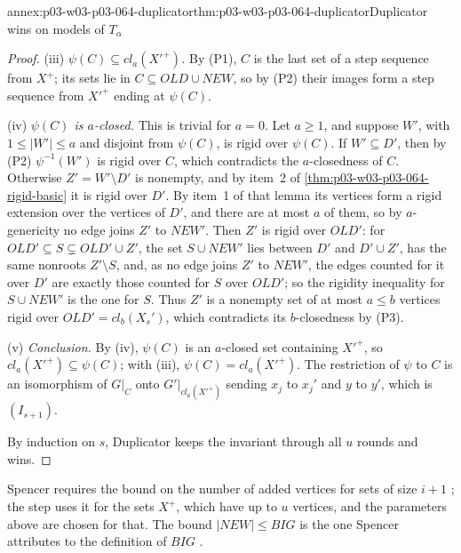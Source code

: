 \begin{annexitem}{annex:p03-w03-p03-064-duplicator}{thm:p03-w03-p03-064-duplicator}{Duplicator wins on models of \(T_\alpha\)}
\begin{proof}
(iii) \emph{\(\psi(C)\subseteq cl_a(X'^+)\).}  By (P1), \(C\) is the last set
of a step sequence from \(X^+\); its sets lie in
\(C\subseteq\mathit{OLD}\cup\mathit{NEW}\), so by (P2) their images form a
step sequence from \(X'^+\) ending at \(\psi(C)\).

(iv) \emph{\(\psi(C)\) is \(a\)-closed.}  This is trivial for \(a=0\).  Let
\(a\geq1\), and suppose \(W'\), with \(1\leq|W'|\leq a\) and disjoint from
\(\psi(C)\), is rigid over \(\psi(C)\).  If \(W'\subseteq D'\), then by (P2)
\(\psi^{-1}(W')\) is rigid over \(C\), which contradicts the \(a\)-closedness
of \(C\).  Otherwise \(Z'=W'\setminus D'\) is nonempty, and by item~2 of
\cref{thm:p03-w03-p03-064-rigid-basic} it is rigid over \(D'\).  By item~1
of that lemma its vertices form a rigid extension over the vertices of
\(D'\), and there are at most \(a\) of them, so by \(a\)-genericity no edge
joins \(Z'\) to \(\mathit{NEW}'\).  Then \(Z'\) is rigid over
\(\mathit{OLD}'\): for \(\mathit{OLD}'\subseteq S\subsetneq\mathit{OLD}'\cup
Z'\), the set \(S\cup\mathit{NEW}'\) lies between \(D'\) and \(D'\cup Z'\),
has the same nonroots \(Z'\setminus S\), and, as no edge joins \(Z'\) to
\(\mathit{NEW}'\), the edges counted for it over \(D'\) are exactly those
counted for \(S\) over \(\mathit{OLD}'\); so the rigidity inequality for
\(S\cup\mathit{NEW}'\) is the one for \(S\).  Thus \(Z'\) is a nonempty set of
at most \(a\leq b\) vertices rigid over \(\mathit{OLD}'=cl_b(X_s')\), which
contradicts its \(b\)-closedness by (P3).

(v) \emph{Conclusion.}  By (iv), \(\psi(C)\) is an \(a\)-closed set containing
\(X'^+\), so \(cl_a(X'^+)\subseteq\psi(C)\); with (iii),
\(\psi(C)=cl_a(X'^+)\).  The restriction of \(\psi\) to \(C\) is an
isomorphism of \(G|_C\) onto \(G'|_{cl_a(X'^+)}\) sending \(x_j\) to
\(x_j'\) and \(y\) to \(y'\), which is \((I_{s+1})\).

By induction on \(s\), Duplicator keeps the invariant through all \(u\)
rounds and wins.
\end{proof}
Spencer requires the bound on the number of added vertices for sets of size
\(i+1\) \cite[p.~11]{Spencer2007LogicRandomStructuresAuthor}; the step uses
it for the sets \(X^+\), which have up to \(u\) vertices, and the parameters
above are chosen for that.  The bound \(|\mathit{NEW}|\leq\mathit{BIG}\)
is the one Spencer attributes to the definition of \(\mathit{BIG}\)
\cite[p.~12]{Spencer2007LogicRandomStructuresAuthor}.
\end{annexitem}

